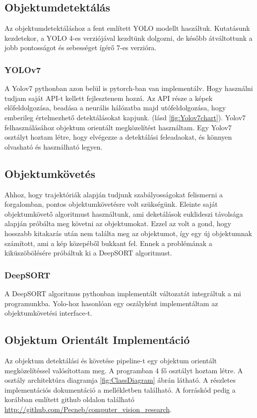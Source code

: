 \documentclass[12pt,a4paper]{article}
\begin{document}
\subsection{Objektumdetektálás}
Az objektumdetektáláshoz a fent említett YOLO modellt haszáltuk. Kutatásunk kezdetekor, a YOLO 4-es verziójával kezdtünk dolgozni,
de később átváltottunk a jobb pontosságot és sebességet ígérő 7-es verzióra.
\subsubsection{YOLOv7}
A Yolov7 pythonban azon belül is pytorch-ban van implementálv. Hogy használni tudjam saját API-t kellett fejlesztenem hozzá.
Az API része a képek előfeldolgozása, beadása a neurális hálózatba majd utófeldolgozása, hogy emberileg értelmezhető detektálásokat
kapjunk. (lásd \ref{fig:Yolov7chart}).
Yolov7 felhasználásához objektum orientált megközelítést használtam. Egy Yolov7 osztályt hoztam létre, hogy elvégezze a detektálási feleadaokat,
és könnyen olvasható és használható legyen.
\subsection{Objektumkövetés}
Ahhoz, hogy trajektóriák alapján tudjunk szabályosságokat felismerni a forgalomban, pontos objektumkövetésre volt szükségünk. Eleinte
saját objektumkövető algoritmust használtunk, ami deketálások euklideszi távolsága alapján próbálta meg követni az objektumokat.
Ezzel az volt a gond, hogy hosszabb kitakarás után nem találta meg az objektumot, így egy új objektumnak számított, ami a kép
közepéből bukkant fel. Ennek a problémának a kiküszöbölésére próbáltuk ki a DeepSORT algoritmust.
\subsubsection{DeepSORT}
A DeepSORT algoritmus pythonban implementált változatát integráltuk a mi programunkba. Yolo-hoz hasonlóan egy oszályként implementáltam az objektumkövetési
interface-t.

\newpage
\subsection{Objektum Orientált Implementáció}
Az objektum detektálási és követése pipeline-t egy objektum orientált megközelítéssel valósítottam meg. A programban 4 fő osztályt hoztam létre. A osztály architektúra diagramja \ref{fig:ClassDiagram} ábrán látható.
A részletes implementációs dokumentáció a mellékletben található. A forráskód pedig a korábban említett github oldalon található \url{http://github.com/Pecneb/computer_vision_research}.
\end{document}
